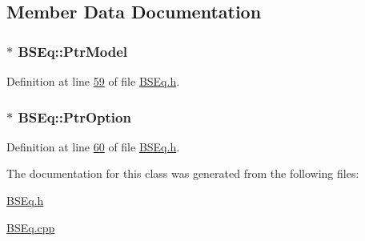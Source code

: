 \subsection{Member Data Documentation}
\hypertarget{classBSEq_a44b63f8349d8ab91a1fb8fc026cdf142}{
\subsubsection[{Ptr\+Model}]{$\ast$ B\+S\+Eq\+::\+Ptr\+Model}}\label{classBSEq_a44b63f8349d8ab91a1fb8fc026cdf142}


Definition at line \hyperlink{BSEq_8h_source_l00059}{59} of file \hyperlink{BSEq_8h_source}{B\+S\+Eq.\+h}.

\hypertarget{classBSEq_a280b15d8a4cd19d1aefc9feeb35a75bb}{
\subsubsection[{Ptr\+Option}]{$\ast$ B\+S\+Eq\+::\+Ptr\+Option}}\label{classBSEq_a280b15d8a4cd19d1aefc9feeb35a75bb}


Definition at line \hyperlink{BSEq_8h_source_l00060}{60} of file \hyperlink{BSEq_8h_source}{B\+S\+Eq.\+h}.



The documentation for this class was generated from the following files\+:\begin{DoxyCompactItemize}
\item 
\hyperlink{BSEq_8h}{B\+S\+Eq.\+h}\item 
\hyperlink{BSEq_8cpp}{B\+S\+Eq.\+cpp}\end{DoxyCompactItemize}
